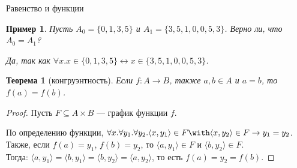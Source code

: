 \documentclass[aspectratio=169]{beamer}
\newtheorem{thm}{Теорема}[section]
\newtheorem{exm}{Пример}[section]
\begin{document}
\begin{frame}{Равенство и функции}
\begin{exm}
Пусть $A_0 = \{0,1,3,5\}$ и $A_1 = \{3,5,1,0,0,5,3\}$.
Верно ли, что $A_0 = A_1$?\pause

Да, так как $\forall x.x \in \{0,1,3,5\} \leftrightarrow x \in \{3,5,1,0,0,5,3\}$.\end{exm}\pause

\begin{thm}[конгруэнтность]
Если $f: A \rightarrow B$, также $a,b\in A$ и $a=b$, то $f(a) = f(b)$.
\end{thm}

\begin{proof}
Пусть $F \subseteq A\times B$ --- график функции $f$.

По определению функции, $\forall x.\forall y_1.\forall y_2.\langle x,y_1\rangle \in F \with \langle x,y_2 \rangle \in F \rightarrow y_1 = y_2$.\\
Также, если $f(a) = y_1$, $f(b) = y_2$, то $\langle a,y_1 \rangle \in F$ и $\langle b,y_2 \rangle \in F$.\\
Тогда: $\langle a,y_1\rangle = \langle b,y_1\rangle = \langle b,y_2 \rangle = \langle a,y_2\rangle$,
то есть $f(a) = y_2 = f(b)$.

\end{proof}
\end{frame}
\end{document}
